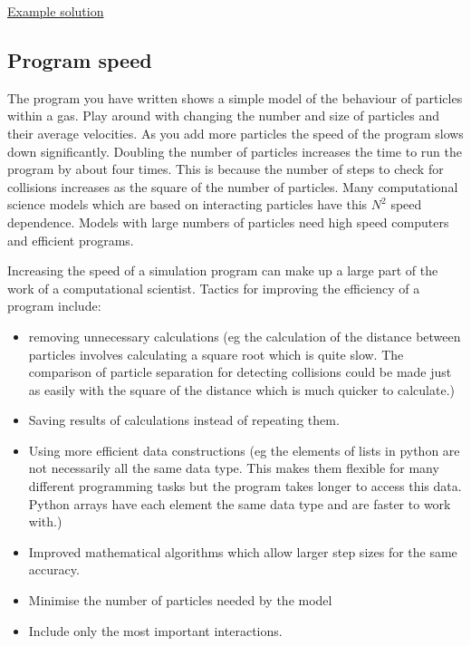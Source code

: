\documentclass[12pt]{article}
\begin{document}
\href{manybounce1.html}{Example solution}

\subsection{Program speed}
The program you have written shows a simple model of the behaviour of particles within a gas.
Play around with changing the number and size of particles and their average velocities.
As you add more particles the speed of the program slows down significantly.
Doubling the number of particles increases the time to run the program by about four times.
This is because the number of steps to check for collisions increases as the square of the
number of particles.
Many computational science models which are based on interacting particles have this $N^2$ speed dependence.
Models with large numbers of particles need high speed computers and efficient programs.

Increasing the speed of a simulation program can make up a large part of the work of a
computational scientist.
Tactics for improving the efficiency of a program include:
\begin{itemize}
\item{removing unnecessary calculations (eg the calculation of the
distance between particles involves calculating a square root which is quite slow.
The comparison of particle separation for detecting collisions could be made
just as easily with the square of the distance which is much quicker to calculate.)}

\item{Saving results of calculations instead of repeating them. }

\item{Using more efficient data constructions (eg the elements of lists
in python are not necessarily all the same data type. This makes them
flexible for many different programming tasks but the program takes
longer to access this data. Python arrays have each element the same
data type and are faster to work with.) }

\item{Improved mathematical algorithms which allow larger step sizes for the same accuracy.}

\item{Minimise the number of particles needed by the model}

\item{Include only the most important interactions.}
\end{itemize}
\end{document}
